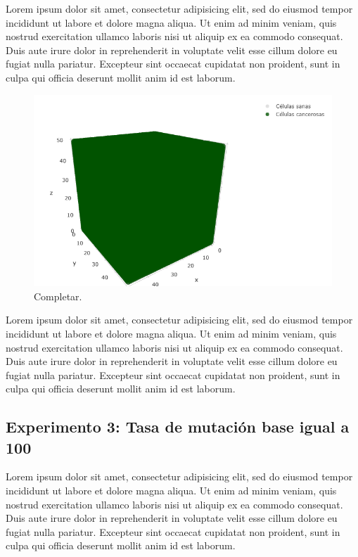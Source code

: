 Lorem ipsum dolor sit amet, consectetur adipisicing elit, sed do eiusmod tempor incididunt ut labore et dolore magna aliqua.
Ut enim ad minim veniam, quis nostrud exercitation ullamco laboris nisi ut aliquip ex ea commodo consequat.
Duis aute irure dolor in reprehenderit in voluptate velit esse cillum dolore eu fugiat nulla pariatur.
Excepteur sint occaecat cupidatat non proident, sunt in culpa qui officia deserunt mollit anim id est laborum.

\begin{figure}[h]
\centering
\includegraphics[scale=0.6]{figures/experiments/exp2/grid}
\caption{Completar.}
\end{figure}

Lorem ipsum dolor sit amet, consectetur adipisicing elit, sed do eiusmod tempor incididunt ut labore et dolore magna aliqua.
Ut enim ad minim veniam, quis nostrud exercitation ullamco laboris nisi ut aliquip ex ea commodo consequat.
Duis aute irure dolor in reprehenderit in voluptate velit esse cillum dolore eu fugiat nulla pariatur.
Excepteur sint occaecat cupidatat non proident, sunt in culpa qui officia deserunt mollit anim id est laborum.

\subsection{Experimento 3: Tasa de mutación base igual a 100}

Lorem ipsum dolor sit amet, consectetur adipisicing elit, sed do eiusmod tempor incididunt ut labore et dolore magna aliqua.
Ut enim ad minim veniam, quis nostrud exercitation ullamco laboris nisi ut aliquip ex ea commodo consequat.
Duis aute irure dolor in reprehenderit in voluptate velit esse cillum dolore eu fugiat nulla pariatur.
Excepteur sint occaecat cupidatat non proident, sunt in culpa qui officia deserunt mollit anim id est laborum.

